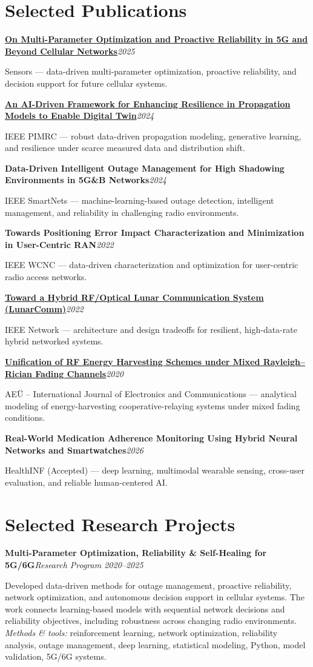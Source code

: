 \documentclass[9pt,letterpaper]{extarticle}
\newcommand{\project}[3]{\Needspace{5\baselineskip}\textbf{#1}\hfill\textit{#2 \textbar{} #3}\par}
\newcommand{\pub}[3]{\Needspace{3\baselineskip}\textbf{#1}\hfill\textit{#2}\par{\small #3\par}}
\begin{document}
\section{Selected Publications}
\pub{\href{https://doi.org/10.3390/s25247651}{On Multi-Parameter Optimization and Proactive Reliability in 5G and Beyond Cellular Networks}}{2025}{Sensors --- data-driven multi-parameter optimization, proactive reliability, and decision support for future cellular systems.}
\pub{\href{https://doi.org/10.1109/PIMRC59610.2024.10817403}{An AI-Driven Framework for Enhancing Resilience in Propagation Models to Enable Digital Twin}}{2024}{IEEE PIMRC --- robust data-driven propagation modeling, generative learning, and resilience under scarce measured data and distribution shift.}
\pub{Data-Driven Intelligent Outage Management for High Shadowing Environments in 5G\&B Networks}{2024}{IEEE SmartNets --- machine-learning-based outage detection, intelligent management, and reliability in challenging radio environments.}
\pub{Towards Positioning Error Impact Characterization and Minimization in User-Centric RAN}{2022}{IEEE WCNC --- data-driven characterization and optimization for user-centric radio access networks.}
\pub{\href{https://arxiv.org/abs/2203.15899}{Toward a Hybrid RF/Optical Lunar Communication System (LunarComm)}}{2022}{IEEE Network --- architecture and design tradeoffs for resilient, high-data-rate hybrid networked systems.}
\pub{\href{https://doi.org/10.1016/j.aeue.2020.153244}{Unification of RF Energy Harvesting Schemes under Mixed Rayleigh--Rician Fading Channels}}{2020}{AEÜ -- International Journal of Electronics and Communications --- analytical modeling of energy-harvesting cooperative-relaying systems under mixed fading conditions.}
\pub{Real-World Medication Adherence Monitoring Using Hybrid Neural Networks and Smartwatches}{2026}{HealthINF (Accepted) --- deep learning, multimodal wearable sensing, cross-user evaluation, and reliable human-centered AI.}

\newpage
\section{Selected Research Projects}
\project{Multi-Parameter Optimization, Reliability \& Self-Healing for 5G/6G}{Research Program}{2020--2025}
Developed data-driven methods for outage management, proactive reliability, network optimization, and autonomous decision support in cellular systems. The work connects learning-based models with sequential network decisions and reliability objectives, including robustness across changing radio environments.\\[-1pt]
{\small\textit{Methods \& tools:} reinforcement learning, network optimization, reliability analysis, outage management, deep learning, statistical modeling, Python, model validation, 5G/6G systems.}
\end{document}
